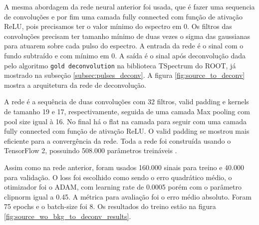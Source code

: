 \documentclass[a4paper,12pt,oneside]{book}
\begin{document}


\par A mesma abordagem da rede neural anterior foi usada, que é fazer uma sequencia de convoluções e por fim uma camada fully connected com função de ativação ReLU, pois precisamos ter o valor mínimo do espectro em 0. Os filtros das convoluções precisam ter tamanho mínimo de duas vezes o sigma das gaussianas para atuarem sobre cada pulso do espectro. A entrada da rede é o sinal com o fundo subtraído e com mínimo em 0. A saída é o sinal após deconvolução dada pelo algoritmo \texttt{gold deconvolution} na biblioteca TSpectrum do ROOT, já mostrado na subseção \ref{subsec:pulses_deconv}. A figura \ref{fig:source_to_deconv} mostra a arquitetura da rede de deconvolução.

\par A rede é a sequência de duas convoluções com 32 filtros, valid padding e kernels de tamanho 19 e 17, respectivamente, seguida de uma camada Max pooling com pool size igual à 16. No final há o flat na camada para seguir com uma camada fully connected com função de ativação ReLU. O valid padding se mostrou mais eficiente para a convergência da rede. Toda a rede foi construída usando o TensorFlow 2, possuindo 508.000 parâmetros treináveis \cite{FORTINO2022166497}.

\par Assim como na rede anterior, foram usados 160.000 sinais para treino e 40.000 para validação. O loss foi escolhido como sendo o erro quadrático médio, o otimizador foi o ADAM, com learning rate de 0.0005 porém com o parâmetro clipnorm igual a 0.45. A métrica para avaliação foi o erro médio absoluto. Foram 75 epochs e o batch-size foi 8. Os resultados do treino estão na figura \ref{fig:source_wo_bkg_to_deconv_results}.
\end{document}
